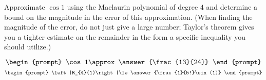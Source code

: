 \documentclass{ximera}
\author{Gregory Hartman \and Matthew Carr}
\begin{document}
\begin{exercise}






Approximate $\cos 1$ using the Maclaurin polynomial of degree $4$ and determine a bound on the magnitude in the error of this approximation. (When finding the magnitude of the error, do not just give a large number; Taylor's theorem gives you a tighter estimate on the remainder in the form a specific inequality you should utilize.)

\[
\begin{prompt}
\cos 1\approx\answer{\frac{13}{24}}
\end{prompt}
\]
\[
\begin{prompt}
\left|R_{4}(1)\right|\le\answer{\frac{1}{5!}\sin(1)}
\end{prompt}
\]

\end{exercise}
\end{document}
